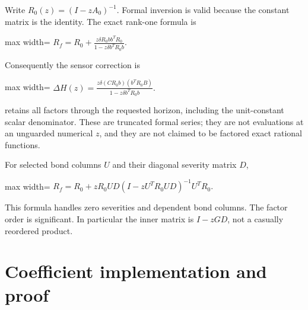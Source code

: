 \documentclass[
  11pt,
  a4paper,
]{report}
\let\singularitytexttt\texttt
\renewcommand{\texttt}[1]{\singularitytexttt{\seqsplit{#1}}}
\begin{document}
Write \(R_0(z)=(I-zA_0)^{-1}\). Formal inversion is valid because the
constant matrix is the identity. The exact rank-one formula is \begin{center}
\begin{adjustbox}{max width=\linewidth}
$\displaystyle
 R_f=R_0+\frac{z\delta R_0bb^TR_0}{1-z\delta b^TR_0b}.
$
\end{adjustbox}
\end{center} Consequently the sensor correction is \begin{center}
\begin{adjustbox}{max width=\linewidth}
$\displaystyle
 \Delta H(z)=\frac{z\delta(CR_0b)(b^TR_0B)}{1-z\delta b^TR_0b}.
$
\end{adjustbox}
\end{center} \texttt{bond\_transfer\_factors} retains all factors through the
requested horizon, including the unit-constant scalar denominator. These
are truncated formal series; they are not evaluations at an unguarded
numerical \(z\), and they are not claimed to be factored exact rational
functions.

For selected bond columns \(U\) and their diagonal severity matrix
\(D\), \begin{center}
\begin{adjustbox}{max width=\linewidth}
$\displaystyle
 R_f=R_0+zR_0UD(I-zU^TR_0UD)^{-1}U^TR_0.
$
\end{adjustbox}
\end{center} This formula handles zero severities and dependent bond columns. The
factor order is significant. In particular the inner matrix is
\(I-zGD\), not a casually reordered product.

\hypertarget{coefficient-implementation-and-proof}{%
\section{Coefficient implementation and
proof}\label{coefficient-implementation-and-proof}}
\end{document}
